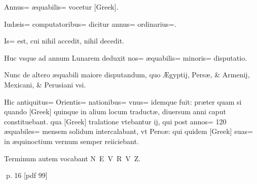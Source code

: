 \begin{parnumbers}
Annus= æquabilis= vocetur [Greek].

Iudæis= computatoribus=  dicitur annus= ordinarius=.

Is= est, cui nihil accedit, nihil decedit.

Huc vsque ad annum Lunarem deduxit nos= æquabilis= minoris= disputatio.

Nunc de altero æquabili maiore disputandum, quo Ægyptij, Persæ, \& Armenij, Mexicani, \& Perusiani vsi.

Hic antiquitus= Orientis= nationibus= vnus= idemque fuit: præter quam si quando [Greek] quinque in alium locum traductæ, diuersum anni caput constituebant. qua [Greek] tralatione vtebantur ij, qui post annos= 120 æquabiles= mensem solidum intercalabant, vt Persæ: qui quidem [Greek] suas= in æquinoctium vernum semper reiiciebant.

Terminum autem vocabant N E V R V Z.
\end{parnumbers}
\clearpage
p. 16 [pdf 99]

